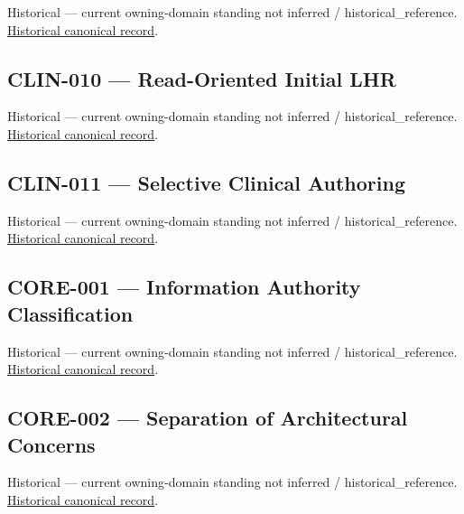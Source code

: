 \par\label{element:4dded2374b9346e4b8d0e326e7d9c97c}
Historical — current owning-domain standing not inferred / historical\_reference. \href{../../../../continuum/motivation/requirement/4dded2374b9346e4b8d0e326e7d9c97c.md}{Historical canonical record}.\par

\subsection{CLIN-010 — Read-Oriented Initial LHR}

\par\label{element:96dad3bf0c764ca0849227eae64848aa}
Historical — current owning-domain standing not inferred / historical\_reference. \href{../../../../continuum/motivation/requirement/96dad3bf0c764ca0849227eae64848aa.md}{Historical canonical record}.\par

\subsection{CLIN-011 — Selective Clinical Authoring}

\par\label{element:bd593ed8f3b3465ca499151f18767585}
Historical — current owning-domain standing not inferred / historical\_reference. \href{../../../../continuum/motivation/requirement/bd593ed8f3b3465ca499151f18767585.md}{Historical canonical record}.\par

\subsection{CORE-001 — Information Authority Classification}

\par\label{element:6e76bb1db8f2464496355d47d2f981ef}
Historical — current owning-domain standing not inferred / historical\_reference. \href{../../../../continuum/motivation/requirement/6e76bb1db8f2464496355d47d2f981ef.md}{Historical canonical record}.\par

\subsection{CORE-002 — Separation of Architectural Concerns}

\par\label{element:a5c09af151984e989590b9198e2def70}
Historical — current owning-domain standing not inferred / historical\_reference. \href{../../../../continuum/motivation/requirement/a5c09af151984e989590b9198e2def70.md}{Historical canonical record}.\par

